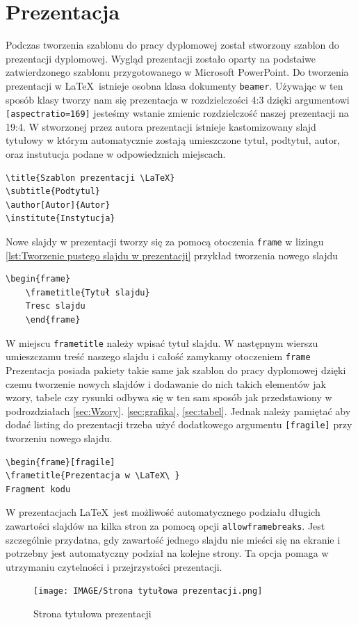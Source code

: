  \section{Prezentacja}
Podczas tworzenia szablonu do pracy dyplomowej został stworzony szablon do prezentacji dyplomowej. Wygląd prezentacji zostało oparty na podstaiwe zatwierdzonego szablonu przygotowanego w Microsoft PowerPoint. Do tworzenia prezentacji w \LaTeX\ istnieje osobna klasa dokumenty \texttt{beamer}. Używając w ten sposób klasy tworzy nam się prezentacja w rozdzielczości 4:3 dzięki argumentowi \texttt{[aspectratio=169]} jesteśmy wstanie zmienic rozdzielczość naszej prezentacji na 19:4. W stworzonej przez autora prezentacji istnieje kastomizowany slajd tytułowy w którym automatycznie zostają umieszczone tytuł, podtytuł, autor, oraz instutucja podane w odpowiedznich miejscach. 
\begin{lstlisting}[caption={Prsonalizacja prezentacji}, label=lst:Personalizacja prezentacji]
\title{Szablon prezentacji \LaTeX}
\subtitle{Podtytul}
\author[Autor]{Autor}
\institute{Instytucja}
\end{lstlisting}

Nowe slajdy w prezentacji tworzy się za pomocą otoczenia \texttt{frame} w lizingu \ref{lst:Tworzenie pustego slajdu w prezentacji} przykład tworzenia nowego slajdu
\begin{lstlisting}[caption={Tworzenie pustego slajdu w prezentacji}, label=lst:Tworzenie pustego slajdu w prezentacji]
\begin{frame}
	\frametitle{Tytuł slajdu} 
	Tresc slajdu
	\end{frame}
\end{lstlisting}
W miejscu \texttt{frametitle} należy wpisać tytuł slajdu. W następnym wierszu umieszczamu treść naszego slajdu i całość zamykamy otoczeniem \texttt{frame} 
Prezentacja posiada pakiety takie same jak szablon do pracy dyplomowej dzięki czemu tworzenie nowych slajdów i dodawanie do nich takich elementów jak wzory, tabele czy rysunki odbywa się w ten sam sposób jak przedstawiony w podrozdziałach \ref{sec:Wzory}. \ref{sec:grafika}, \ref{sec:tabel}. Jednak należy pamiętać aby dodać listing do prezentacji trzeba użyć dodatkowego argumentu \texttt{[fragile]} przy tworzeniu nowego slajdu.
\begin{lstlisting}[caption={Slajd z kodem źródłowym}, label=lst:Slajd z kodem źródłowym]
\begin{frame}[fragile]
\frametitle{Prezentacja w \LaTeX\ } 
Fragment kodu
\end{lstlisting}
 W prezentacjach \LaTeX\ jest możliwość automatycznego podziału długich zawartości slajdów na kilka stron za pomocą opcji \texttt{allowframebreaks}. Jest szczególnie przydatna, gdy zawartość jednego slajdu nie mieści się na ekranie i potrzebny jest automatyczny podział na kolejne strony. Ta opcja pomaga w utrzymaniu czytelności i przejrzystości prezentacji.
\begin{figure}[!ht]
\centering 
\texttt{[image: IMAGE/Strona tytułowa prezentacji.png]}
\caption{Strona tytułowa prezentacji}
\label{rys:Strona tytułowa prezentacji}
\end{figure}


